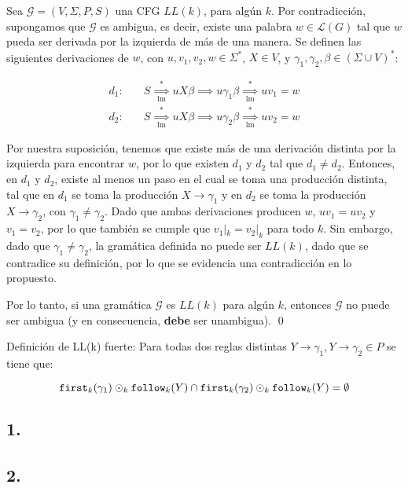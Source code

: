 \documentclass[letter]{article}
\def\derives*{\underset{\text{lm}}{\overset{*}{\implies}}}
\begin{document}
\begin{pregunta}{1} %

    Sea $\mathcal{G} = (V, \Sigma, P, S)$ una CFG $LL(k)$, para algún $k$. Por contradicción, supongamos que $\mathcal{G}$ es ambigua, es decir, existe una palabra $w \in \mathcal{L}(G)$ tal que $w$ pueda ser derivada por la izquierda de más de una manera. Se definen las siguientes derivaciones de $w$, con $u, v_1, v_2, w \in \Sigma^*$, $X \in V$, y $\gamma_1, \gamma_2, \beta \in (\Sigma \cup V)^*$:

    \begin{align*}
        d_1: & \quad S \derives* u X \beta \implies u \gamma_1 \beta \derives* u v_1 = w \\
        d_2: & \quad S \derives* u X \beta \implies u \gamma_2 \beta \derives* u v_2 = w
    \end{align*}

    Por nuestra suposición, tenemos que existe más de una derivación distinta por la izquierda para encontrar $w$, por lo que existen $d_1$ y $d_2$ tal que $d_1 \neq d_2$. Entonces, en $d_1$ y $d_2$, existe al menos un paso en el cual se toma una producción distinta, tal que en $d_1$ se toma la producción $X \to \gamma_1$ y en $d_2$ se toma la producción $X \to \gamma_2$, con $\gamma_1 \neq \gamma_2$. Dado que ambas derivaciones producen $w$, $u v_1 = u v_2$ y $v_1 = v_2$, por lo que también se cumple que $v_1|_k = v_2|_k$ para todo $k$. Sin embargo, dado que $\gamma_1 \neq \gamma_2$, la gramática definida no puede ser $LL(k)$, dado que se contradice su definición, por lo que se evidencia una contradicción en lo propuesto.

    Por lo tanto, si una gramática $\mathcal{G}$ es $LL(k)$ para algún $k$, entonces $\mathcal{G}$ no puede ser ambigua (y en consecuencia, \textbf{debe} ser unambigua). \qed






\end{pregunta}

\begin{pregunta}{2} %

    Definición de LL(k) fuerte: Para todas dos reglas distintas $Y \to \gamma_1, Y \to\gamma_2 \in P$ se tiene que:

    $$\text{\texttt{first}}_k(\gamma_1) \odot_k \text{\texttt{follow}}_k(Y) \cap \text{\texttt{first}}_k(\gamma_2) \odot_k \text{\texttt{follow}}_k(Y) = \emptyset$$


    \subsection*{1.}




    \subsection*{2.}

\end{pregunta}
\end{document}
